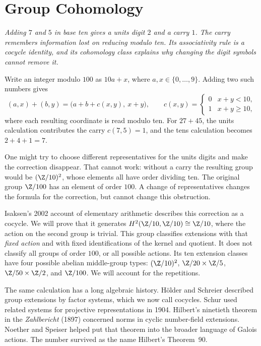 \chapter{Group Cohomology}

\begin{center}\itshape
Adding $7$ and $5$ in base ten gives a units digit $2$ and a carry $1$. The carry remembers information lost on reducing modulo ten. Its associativity rule is a cocycle identity, and its cohomology class explains why changing the digit symbols cannot remove it.
\end{center}

Write an integer modulo $100$ as $10a+x$, where $a,x\in\{0,\ldots,9\}$. Adding two such numbers gives
\[
(a,x)+(b,y)=\bigl(a+b+c(x,y),\ x+y\bigr),
\qquad c(x,y)=\begin{cases}0&x+y<10,\\1&x+y\ge10,\end{cases}
\]
where each resulting coordinate is read modulo ten. For $27+45$, the units calculation contributes the carry $c(7,5)=1$, and the tens calculation becomes $2+4+1=7$.

One might try to choose different representatives for the units digits and make the correction disappear. That cannot work: without a carry the resulting group would be $(\Z/10)^2$, whose elements all have order dividing ten. The original group $\Z/100$ has an element of order $100$. A change of representatives changes the formula for the correction, but cannot change this obstruction.

Isaksen's 2002 account of elementary arithmetic describes this correction as a cocycle. We will prove that it generates
$H^2(\Z/10,\Z/10)\cong\Z/10$, where the action on the second group is trivial. This group classifies extensions with that \emph{fixed action} and with fixed identifications of the kernel and quotient. It does not classify all groups of order $100$, or all possible actions. Its ten extension classes have four possible abelian middle-group types: $(\Z/10)^2$, $\Z/20\times\Z/5$, $\Z/50\times\Z/2$, and $\Z/100$. We will account for the repetitions.

The same calculation has a long algebraic history. H\"older and Schreier described group extensions by factor systems, which we now call cocycles. Schur used related systems for projective representations in 1904. Hilbert's ninetieth theorem in the \emph{Zahlbericht} (1897) concerned norms in cyclic number-field extensions. Noether and Speiser helped put that theorem into the broader language of Galois actions. The number survived as the name Hilbert's Theorem~90.

